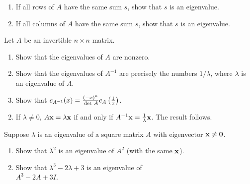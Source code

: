 \begin{multicols}{2}
\begin{ex}
\begin{sol}
\begin{enumerate}[label={\alph*.}]
\end{enumerate}
\end{sol}
\end{ex}

\begin{ex}
\begin{enumerate}[label={\alph*.}]
\item If all rows of $A$ have the same sum $s$, show that $s$ is an eigenvalue.

\item If all columns of $A$ have the same sum $s$, show that $s$ is an eigenvalue.

\end{enumerate}
\end{ex}

\begin{ex}
Let $A$ be an invertible $n \times n$ matrix.


\begin{enumerate}[label={\alph*.}]
\item Show that the eigenvalues of $A$ are nonzero.

\item Show that the eigenvalues of $A^{-1}$ are precisely the numbers $1/\lambda$, where $\lambda$ is an eigenvalue of $A$.

\item Show that $c_{A^{-1}}(x) = \tfrac{(-x)^n}{\thinspace\operatorname{det \medspace} A} c_A \left( \tfrac{1}{x} \right)$.


\end{enumerate}
\begin{sol}
\begin{enumerate}[label={\alph*.}]
\setcounter{enumi}{1}
\item  If $\lambda \neq 0$, $A\textbf{x} = \lambda\textbf{x}$ if and only if $A^{-1}\textbf{x} = \tfrac{1}{\lambda}\textbf{x}$.
 The result follows.

\end{enumerate}
\end{sol}
\end{ex}

\begin{ex}
Suppose $\lambda$ is an eigenvalue of a square matrix $A$ with eigenvector $\textbf{x} \neq \textbf{0}$.


\begin{enumerate}[label={\alph*.}]
\item Show that $\lambda^{2}$ is an eigenvalue of $A^{2}$ (with the same $\textbf{x}$).

\item Show that $\lambda^{3} - 2 \lambda + 3$ is an eigenvalue of \\ $A^{3} - 2A + 3I$.


\end{enumerate}
\end{ex}
\end{multicols}
